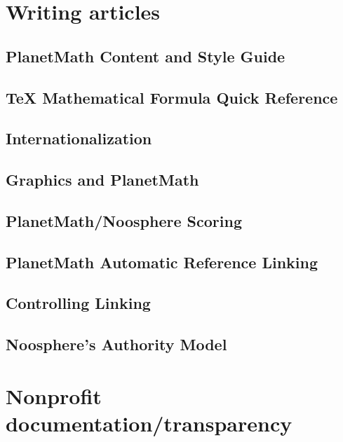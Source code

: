 \documentclass[12pt,report]{memoir}
\begin{document}
\chapter{Writing articles}

\section{PlanetMath Content and Style Guide}


\section{TeX Mathematical Formula Quick Reference}


\section{Internationalization}


\section{Graphics and PlanetMath}


\section{PlanetMath/Noosphere Scoring}


\section{PlanetMath Automatic Reference Linking}


\section{Controlling Linking}


\section{Noosphere's Authority Model}


\chapter{Nonprofit documentation/transparency}
\end{document}

